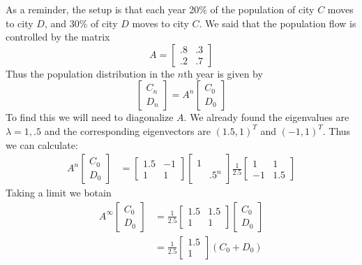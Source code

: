 \documentclass[11pt,oneside]{amsbook}
\theoremstyle{definition}
\theoremstyle{plain}
\theoremstyle{definition}
\theoremstyle{remark}
\numberwithin{equation}{section}
\numberwithin{figure}{section}
\begin{document}
As a reminder, the setup is that each year 20\% of the population of city $C$ moves to city $D$, and 30\% of city $D$ moves to city $C$. We said that the population flow is controlled by the matrix
\[A=\begin{bmatrix}.8&.3\\.2&.7\end{bmatrix}
\]
Thus the population distribution in the $n$th year is given by
\[\begin{bmatrix}C_n\\D_n\end{bmatrix}
  =A^n\begin{bmatrix}C_0\\D_0\end{bmatrix}
\]
To find this we will need to diagonalize $A$. We already found the eigenvalues are $\lambda=1,.5$ and the corresponding eigenvectors are $(1.5,1)^T$ and $(-1,1)^T$. Thus we can calculate:
\begin{align*}
  A^n\begin{bmatrix}C_0\\D_0\end{bmatrix}
  &=\begin{bmatrix}1.5&-1\\1&1\end{bmatrix}
    \begin{bmatrix}1\\&.5^n\end{bmatrix}
    \frac{1}{2.5}
    \begin{bmatrix}1&1\\-1&1.5\end{bmatrix}
\end{align*}
Taking a limit we botain
\begin{align*}
  A^\infty\begin{bmatrix}C_0\\D_0\end{bmatrix}
  &=\frac{1}{2.5}\begin{bmatrix}1.5&1.5\\1&1\end{bmatrix}
     \begin{bmatrix}C_0\\D_0\end{bmatrix}\\
  &=\frac{1}{2.5}\begin{bmatrix}1.5\\1\end{bmatrix}
   (C_0+D_0)
\end{align*}
\end{document}
